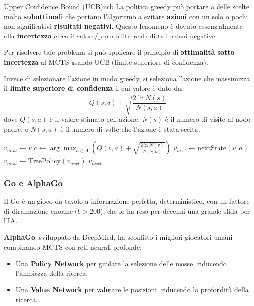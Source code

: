 \begin{nota}{Upper Confidence Bound (UCB)}{ucb}
    La politica greedy può portare a delle scelte molto \textbf{subottimali} che
    portano l'algoritmo a evitare \textbf{azioni} con un solo o pochi non
    significativi \textbf{risultati negativi}.
    Questo fenomeno è dovuto essenzialmente alla \textbf{incertezza} circa il
    valore/probabilità reale di tali azioni negative.

    Per risolvere tale problema si può applicare il principio di
    \textbf{ottimalità sotto incertezza} al MCTS usando UCB (limite superiore
    di confidenza).
    
    Invece di selezionare l'azione in modo greedy, si seleziona l'azione che
    massimizza il \textbf{limite superiore di confidenza} il cui valore è dato da:
    \[ Q(s,a) + \sqrt{\frac{2\ln{N(s)}}{N(s,a)}} \]
    dove $Q(s,a)$ è il valore stimato dell'azione, $N(s)$ è il numero di visite
    al nodo padre, e $N(s,a)$ è il numero di volte che l'azione è stata scelta.

    \begin{algorithm}[H]
        \caption{Upper Confidence Tree policy}
        \label{alg:ucb-tree-policy}
        \begin{algorithmic}[1]
                \State $v_{next} \leftarrow v$
                    \State $a \leftarrow \arg\max_{a \in A} \left( Q(v, a) + \sqrt{\frac{2\ln{N(v)}}{N(v,a)}} \right)$
                    \State $v_{next} \leftarrow \text{nextState}(v, a)$
                    \State $v_{next} \leftarrow \text{TreePolicy}(v_{next})$
                \EndIf
                \State \Return $v_{next}$
            \EndFunction
        \end{algorithmic}
    \end{algorithm}
\end{nota}

\subsubsection{Go e AlphaGo}

Il Go è un gioco da tavolo a informazione perfetta, deterministico, con un
fattore di diramazione enorme ($b > 200$), che lo ha reso per decenni una
grande sfida per l'IA.

\textbf{AlphaGo}, sviluppato da DeepMind, ha sconfitto i migliori giocatori
umani combinando MCTS con reti neurali profonde:
\begin{itemize}
    \item Una \textbf{Policy Network} per guidare la selezione delle mosse,
    riducendo l'ampiezza della ricerca.
    \item Una \textbf{Value Network} per valutare le posizioni, riducendo
    la profondità della ricerca.
\end{itemize}


